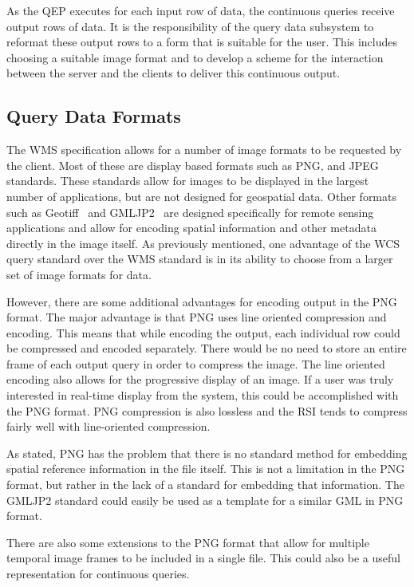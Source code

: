 \documentclass{ucdthesis}       %
\begin{document}
As the \ac{QEP} executes for each input row of data, the continuous
queries receive output rows of data.  It is the responsibility of the
query data subsystem to reformat these output rows to a form that is
suitable for the user.  This includes choosing a suitable image
format and to develop a scheme for the interaction between the server
and the clients to deliver this continuous output.

\subsection{Query Data Formats}
\label{sec:format}

The \ac{WMS} specification allows for a number of image formats to be
requested by the client.  Most of these are display based formats such
as \ac{PNG}, and \ac{JPEG} standards.  These standards allow for
images to be displayed in the largest number of applications, but are
not designed for geospatial data.  Other formats such as
Geotiff~\cite{ritter00geotif-format} and
\ac{GMLJP2}~\cite{ogc06gml-in} are designed specifically for remote
sensing applications and allow for encoding spatial information and
other metadata directly in the image itself.  As previously mentioned,
one advantage of the \ac{WCS} query standard over the \ac{WMS}
standard is in its ability to choose from a larger set of image
formats for data.

However, there are some additional advantages for encoding output in
the \ac{PNG} format.  The major advantage is that \ac{PNG} uses line
oriented compression and encoding.  This means that while encoding the
output, each individual row could be compressed and encoded
separately.  There would be no need to store an entire frame of each
output query in order to compress the image.  The line oriented
encoding also allows for the progressive display of an image.  If a
user was truly interested in real-time display from the system, this
could be accomplished with the \ac{PNG} format.  \ac{PNG} compression
is also lossless and the \ac{RSI} tends to compress fairly well with
line-oriented compression.

As stated, \ac{PNG} has the problem that there is no standard method
for embedding spatial reference information in the file itself.  This
is not a limitation in the \ac{PNG} format, but rather in the lack of
a standard for embedding that information.  The \ac{GMLJP2} standard
could easily be used as a template for a similar \ac{GML} in \ac{PNG}
format.

There are also some extensions to the \ac{PNG} format that allow for
multiple temporal image frames to be included in a single file.  This
could also be a useful representation for continuous queries.
\end{document}
